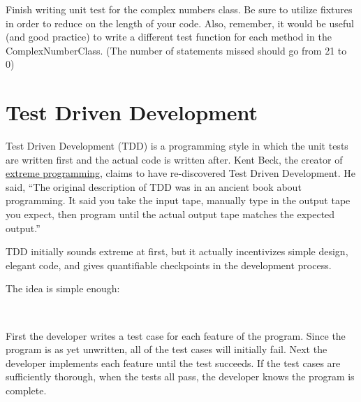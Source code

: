 \begin{problem}
Finish writing unit test for the complex numbers class. Be sure to utilize fixtures in order to reduce on the length of your code.
Also, remember, it would be useful (and good practice) to write a different test function for each method in the ComplexNumberClass.
(The number of statements missed should go from 21 to 0)
\end{problem}


\section*{Test Driven Development}

Test Driven Development (TDD) is a programming style in which the unit tests are written first and the actual code is written after.
Kent Beck, the creator of \href{https://en.wikipedia.org/wiki/Extreme_programming}{extreme programming}, claims to have re-discovered  Test Driven Development. He said,
``The original description of TDD was in an ancient book about programming. It said you take the input tape, manually type in the output tape you expect, then program until the actual output tape matches the expected output.''

TDD initially sounds extreme at first, but it actually incentivizes simple design, elegant code, and gives quantifiable checkpoints in the development process.

The idea is simple enough:
\begin{center}
\\
\end{center}

First the developer writes a test case for each feature of the program. Since the program is as yet unwritten, all of the test cases will initially fail. Next the developer implements each feature until the test succeeds. If the test cases are sufficiently thorough, when the tests all pass, the developer knows the program is complete.

